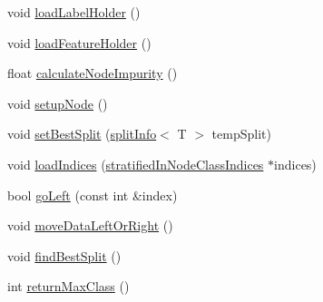 \begin{DoxyCompactItemize}
\item 
void \hyperlink{classfp_1_1unprocessedNode_a7b286c437f8f73fb3431358c11898a82}{load\+Label\+Holder} ()
\item 
void \hyperlink{classfp_1_1unprocessedNode_a8cedeb8c4c88345ff97f9afb89b3ccd0}{load\+Feature\+Holder} ()
\item 
float \hyperlink{classfp_1_1unprocessedNode_a0278b4dd8d905d38d75ced9a95839a12}{calculate\+Node\+Impurity} ()
\item 
void \hyperlink{classfp_1_1unprocessedNode_a713ab68816b13b1a82d667ac6f1640d7}{setup\+Node} ()
\item 
void \hyperlink{classfp_1_1unprocessedNode_ae7ad0b6bf8142ea5d3d851e29b5b9aee}{set\+Best\+Split} (\hyperlink{classfp_1_1splitInfo}{split\+Info}$<$ T $>$ temp\+Split)
\item 
void \hyperlink{classfp_1_1unprocessedNode_af5580595b612e9b3f5ddc4f28c43775c}{load\+Indices} (\hyperlink{classfp_1_1stratifiedInNodeClassIndices}{stratified\+In\+Node\+Class\+Indices} $\ast$indices)
\item 
bool \hyperlink{classfp_1_1unprocessedNode_ad4ffdb4f4b91d6d21f8954f3c80a3617}{go\+Left} (const int \&index)
\item 
void \hyperlink{classfp_1_1unprocessedNode_a0236d2722cb4c32b8ff7e66fc118bed2}{move\+Data\+Left\+Or\+Right} ()
\item 
void \hyperlink{classfp_1_1unprocessedNode_a5fea1583d2250e14470d92568b57e60c}{find\+Best\+Split} ()
\item 
int \hyperlink{classfp_1_1unprocessedNode_af038553809a2e6d1cbe04adaba1c6b21}{return\+Max\+Class} ()
\end{DoxyCompactItemize}
